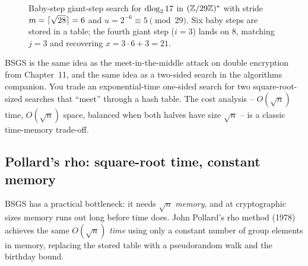 \begin{figure}[htbp]
\caption{Baby-step giant-step search for $\operatorname{dlog}_2 17$ in $(\mathbb{Z}/29\mathbb{Z})^{*}$ with stride $m = \lceil\sqrt{28}\rceil = 6$ and $u = 2^{-6} \equiv 5 \pmod{29}$. Six baby steps are stored in a table; the fourth giant step ($i = 3$) lands on $8$, matching $j = 3$ and recovering $x = 3 \cdot 6 + 3 = 21$.}
\label{ch20:fig-bsgs}
\end{figure}

\begin{connectionbox}
BSGS is the same idea as the meet-in-the-middle attack on double encryption from Chapter~11,
and the same idea as a two-sided search in the algorithms companion. You trade an
exponential-time one-sided search for two square-root-sized searches that ``meet'' through a hash
table. The cost analysis -- $O(\sqrt{n})$ time, $O(\sqrt{n})$ space, balanced when both halves have size
$\sqrt{n}$ -- is a classic time-memory trade-off.
\end{connectionbox}

\subsection{Pollard's rho: square-root time, constant memory}

BSGS has a practical bottleneck: it needs $\sqrt{n}$ \emph{memory}, and at cryptographic sizes memory runs out long before time does. John Pollard's rho method (1978) achieves the same $O(\sqrt{n})$
\emph{time} using only a constant number of group elements in memory, replacing the stored table with a
pseudorandom walk and the birthday bound.

